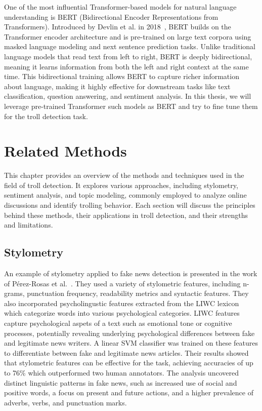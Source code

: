 \documentclass[twoside]{ctuthesis}
\theoremstyle{plain}
\theoremstyle{definition}
\theoremstyle{note}
\begin{document}
One of the most influential Transformer-based models for natural language understanding is BERT (Bidirectional Encoder Representations from Transformers). Introduced by Devlin et al. in 2018~\cite{Devlin2018}, BERT builds on the Transformer encoder architecture and is pre-trained on large text corpora using masked language modeling and next sentence prediction tasks. Unlike traditional language models that read text from left to right, BERT is deeply bidirectional, meaning it learns information from both the left and right context at the same time. This bidirectional training allows BERT to capture richer information about language, making it highly effective for downstream tasks like text classification, question answering, and sentiment analysis. In this thesis, we will leverage pre-trained Transformer such models as BERT and try to fine tune them for the troll detection task.\par

\chapter{Related Methods}
This chapter provides an overview of the methods and techniques used in the field of troll detection. It explores various approaches, including stylometry, sentiment analysis, and topic modeling, commonly employed to analyze online discussions and identify trolling behavior. Each section will discuss the principles behind these methods, their applications in troll detection, and their strengths and limitations.\par

\section{Stylometry}
An example of stylometry applied to fake news detection is presented in the work of Pérez-Rosas et al.~\cite{PerezRosas2018Stylometry}. They used a variety of stylometric features, including n-grams, punctuation frequency, readability metrics and syntactic features. They also incorporated psycholingustic features extracted from the LIWC lexicon which categorize words into various psychological categories. LIWC features capture psychological aspets of a text such as emotional tone or cognitive processes, potentially revealing underlying psychological differences between fake and legitimate news writers. A linear SVM classifier was trained on these features to differentiate between fake and legitimate news articles. Their results showed that stylometric features can be effective for the task, achieving accuracies of up to 76\% which outperformed two human annotators. The analysis uncovered distinct linguistic patterns in fake news, such as increased use of social and positive words, a focus on present and future actions, and a higher prevalence of adverbs, verbs, and punctuation marks. 
\end{document}
